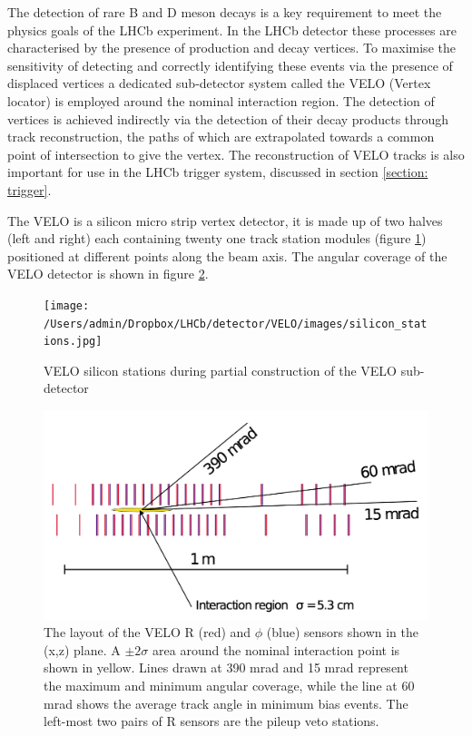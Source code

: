 
The detection of rare B and D meson decays is a key requirement to meet the physics goals of the LHCb experiment.  In the LHCb detector these processes are characterised by the presence of production and decay vertices. To maximise the sensitivity of detecting and correctly identifying these events via the presence of displaced vertices a dedicated sub-detector system called the VELO (Vertex locator) is employed around the nominal interaction region. The detection of vertices is achieved indirectly via the detection of their decay products through track reconstruction, the paths of which are extrapolated towards a common point of intersection to give the vertex. The reconstruction of VELO tracks is also important for use in the LHCb trigger system, discussed in section \ref{section: trigger}.

The VELO is a silicon micro strip vertex detector, it is made up of two halves (left and right) each containing twenty one track station modules (figure \ref{fig: VELO_silicon_stations}) positioned at different points along the beam axis. The angular coverage of the VELO detector is shown in figure \ref{fig: velo angular acceptance}.

\begin{figure}
	\centering
	\texttt{[image: /Users/admin/Dropbox/LHCb/detector/VELO/images/silicon\_stations.jpg]}
	\caption{VELO silicon stations during partial construction of the VELO sub-detector}
	\label{fig: VELO_silicon_stations}
\end{figure}

\begin{figure}
	\centering
	\includegraphics[width=0.7\columnwidth]{Chapters/detector/images/velo_angular_acceptance.png}
	\caption{The layout of the VELO R (red) and $\phi$ (blue) sensors shown in the (x,z) plane. A $\pm2\sigma$ area around the nominal interaction point is shown in yellow. Lines drawn at 390 mrad and 15 mrad represent the maximum and minimum angular coverage, while the line at 60 mrad shows the average track angle in minimum bias events. The left-most two pairs of R sensors are the pileup veto stations.}
	\label{fig: velo angular acceptance}
\end{figure}

